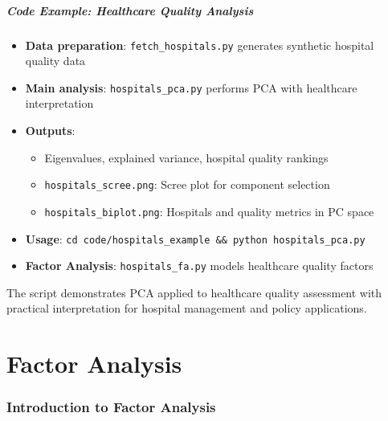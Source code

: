 \documentclass[aspectratio=169]{beamer}
\begin{document}
\begin{frame}
    \frametitle{Code Example: Healthcare Quality Analysis}
    \begin{itemize}
        \item \textbf{Data preparation}: \texttt{fetch\_hospitals.py} generates synthetic hospital quality data \pause
        \item \textbf{Main analysis}: \texttt{hospitals\_pca.py} performs PCA with healthcare interpretation \pause
        \item \textbf{Outputs}:
              \begin{itemize}
                  \item Eigenvalues, explained variance, hospital quality rankings \pause
                  \item \texttt{hospitals\_scree.png}: Scree plot for component selection \pause
                  \item \texttt{hospitals\_biplot.png}: Hospitals and quality metrics in PC space \pause
              \end{itemize}
        \item \textbf{Usage}: \texttt{cd code/hospitals\_example \&\& python hospitals\_pca.py} \pause
        \item \textbf{Factor Analysis}: \texttt{hospitals\_fa.py} models healthcare quality factors \pause
    \end{itemize}
    \vspace{6pt}
    The script demonstrates PCA applied to healthcare quality assessment with practical interpretation for hospital management and policy applications.
\end{frame}


\part{Factor Analysis}

\begin{frame}
    \partpage
\end{frame}

\section{Introduction to Factor Analysis}
\end{document}
